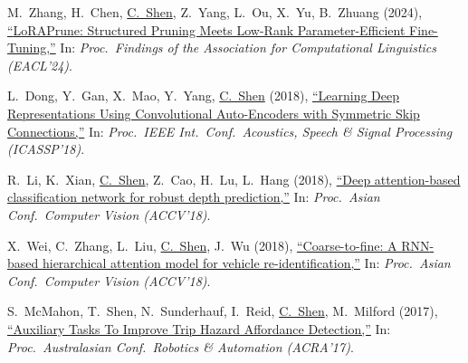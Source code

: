\documentclass[9pt, a4paper]{article}
\newcommand{\years}[1]{\marginnote{\scriptsize #1}}
\def\highlight{\uline}
\begin{document}
\medskip

\years{2024} M.~Zhang, H.~Chen, \highlight{C.~Shen}, Z.~Yang, L.~Ou, X.~Yu, B.~Zhuang (2024),
\href{http://www.google.com/search?lr=&ie=UTF-8&oe=UTF-8&q=LoRAPrune%3A+Structured+Pruning+Meets+Low-Rank+Parameter-Efficient+Fine-Tuning+Mingyang+Zhang%2C+Hao+Chen%2C+Chunhua+Shen%2C+Zhen+Yang%2C+Linlin+Ou%2C+Xinyi+Yu%2C+Bohan+Zhuang}{``{LoRAPrune}: Structured Pruning Meets Low-Rank Parameter-Efficient Fine-Tuning,{}''}
In: \emph{Proc.\ Findings of the Association for Computational Linguistics (EACL'24)}.

\medskip

\years{2018} L.~Dong, Y.~Gan, X.~Mao, Y.~Yang, \highlight{C.~Shen} (2018),
\href{http://www.google.com/search?lr=&ie=UTF-8&oe=UTF-8&q=Learning+Deep+Representations+Using+Convolutional+Auto-Encoders+with+Symmetric+Skip+Connections+Lian-Feng+Dong%2C+Yuan-Zhu+Gan%2C+Xiao-Liao+Mao%2C+Yu-Bin+Yang%2C+Chunhua+Shen}{``Learning Deep Representations Using Convolutional Auto-Encoders with Symmetric Skip Connections,{}''}
In: \emph{Proc.\ IEEE Int.\ Conf.\  Acoustics, Speech \& Signal Processing (ICASSP'18)}.

\medskip

\years{2018} R.~Li, K.~Xian, \highlight{C.~Shen}, Z.~Cao, H.~Lu, L.~Hang (2018),
\href{http://www.google.com/search?lr=&ie=UTF-8&oe=UTF-8&q=Deep+attention-based+classification+network+for+robust+depth+prediction+Ruibo+Li%2C+Ke+Xian%2C+Chunhua+Shen%2C+Zhiguo+Cao%2C+Hao+Lu%2C+Lingxiao+Hang}{``Deep attention-based classification network for robust depth prediction,{}''}
In: \emph{Proc.\ Asian Conf.\  Computer Vision (ACCV'18)}.

\medskip

\years{2018} X.~Wei, C.~Zhang, L.~Liu, \highlight{C.~Shen}, J.~Wu (2018),
\href{http://www.google.com/search?lr=&ie=UTF-8&oe=UTF-8&q=Coarse-to-fine%3A+A+RNN-based+hierarchical+attention+model+for+vehicle+re-identification+Xiu-Shen+Wei%2C+Chen-Lin+Zhang%2C+Lingqiao+Liu%2C+Chunhua+Shen%2C+Jianxin+Wu}{``Coarse-to-fine: A {RNN}-based hierarchical attention model for vehicle re-identification,{}''}
In: \emph{Proc.\ Asian Conf.\  Computer Vision (ACCV'18)}.

\medskip

\years{2017} S.~McMahon, T.~Shen, N.~Sunderhauf, I.~Reid, \highlight{C.~Shen}, M.~Milford (2017),
\href{http://www.google.com/search?lr=&ie=UTF-8&oe=UTF-8&q=Auxiliary+Tasks+To+Improve+Trip+Hazard+Affordance+Detection+Sean+McMahon%2C+Tong+Shen%2C+Niko+Sunderhauf%2C+Ian+Reid%2C+Chunhua+Shen%2C+Michael+Milford}{``Auxiliary Tasks To Improve Trip Hazard Affordance Detection,{}''}
In: \emph{Proc.\ Australasian Conf.\  Robotics \& Automation (ACRA'17)}.
\end{document}
